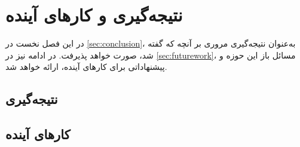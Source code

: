 \chapter{نتیجه‌گیری و کا‌ر‌های آینده}
\label{chap:conclusion}
در این فصل نخست در 
\autoref{sec:conclusion}،
به‌عنوان نتیجه‌گیری مروری بر آنچه که گفته شد، صورت خواهد پذیرفت. در ادامه نیز در 
\autoref{sec:futurework}،
مسائل باز این حوزه و پیشنهاداتی برای کارهای آینده، ارائه خواهد شد. 

\section{نتیجه‌گیری}
\label{sec:conclusion}


\section{کارهای آینده}
\label{sec:futurework}